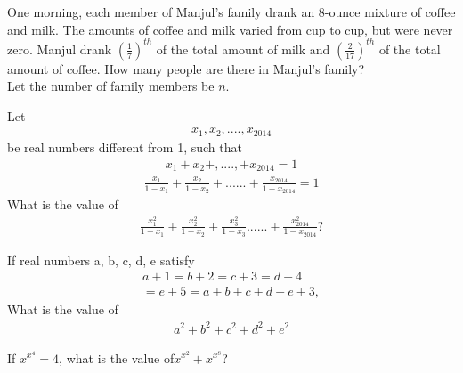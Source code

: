 \item One morning, each member of Manjul's family drank an 8-ounce mixture of coffee and milk. The amounts of coffee and milk varied from cup to cup, but were never zero. Manjul drank $(\frac{1}{7})^{th}$ of the total amount of milk and 
$(\frac{2}{17})^{th}$ of the total amount of coffee. How many people are there in Manjul's family?
\\
\solution Let the number of family members be $n$.
\item Let 
\begin{align*}
x_{1}, x_{2},....,x_{2014}
\end{align*}
be real numbers different from 1, such that 
\begin{align*}
x_{1} + x_{2} +,....,+ x_{2014} = 1
\end{align*} 
\begin{align*}
\frac{x_1}{1 - x_1} + \frac{x_2}{1 - x_2} +...... + \frac{x_{2014}}{1 - x_{2014}} = 1
\end{align*}
What is the value of  
\begin{align*}
\frac{x_1^2}{1 - x_1} + \frac{x_2^2}{1 - x_2} + \frac{x_3^2}{1 - x_3}...... + \frac{x^2_{2014}}{1 - x_{2014}}?
\end{align*}

\item If real numbers a, b, c, d, e satisfy 
\begin{align*}
a + 1 = b + 2 = c + 3 = d + 4 \\= e + 5 = a + b + c + d + e + 3,
\end{align*}
What is the value of 
\begin{align*}
a^2 + b^2 + c^2 + d^2 + e^2
\end{align*}


\item If $x^{x^{4}} = 4$, what is the value of$x^{x^{2}} + x^{x^{8}}$?



